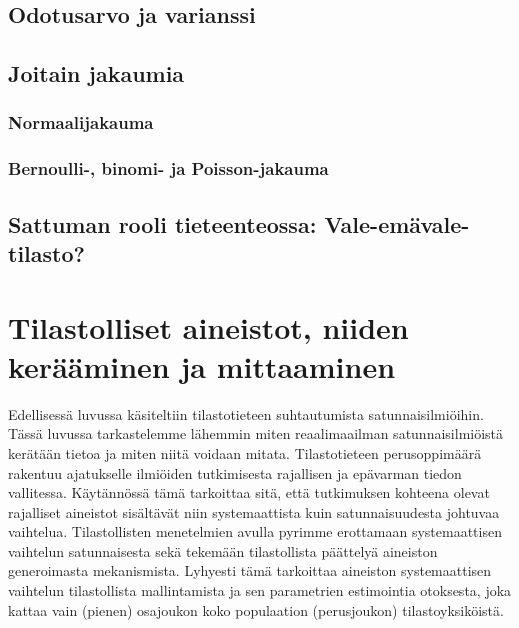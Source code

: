 \documentclass[
]{book}
\begin{document}
\hypertarget{alaluku44}{%
\section{Odotusarvo ja varianssi}\label{alaluku44}}

\hypertarget{alaluku45}{%
\section{Joitain jakaumia}\label{alaluku45}}

\hypertarget{normaalijakauma}{%
\subsection{Normaalijakauma}\label{normaalijakauma}}

\hypertarget{bernoulli--binomi--ja-poisson-jakauma}{%
\subsection{Bernoulli-, binomi- ja Poisson-jakauma}\label{bernoulli--binomi--ja-poisson-jakauma}}

\hypertarget{alaluku46}{%
\section{Sattuman rooli tieteenteossa: Vale-emävale-tilasto?}\label{alaluku46}}

\hypertarget{luku5}{%
\chapter{Tilastolliset aineistot, niiden kerääminen ja mittaaminen}\label{luku5}}

Edellisessä luvussa käsiteltiin tilastotieteen suhtautumista satunnaisilmiöihin. Tässä luvussa tarkastelemme lähemmin miten reaalimaailman satunnaisilmiöistä kerätään tietoa ja miten niitä voidaan mitata. Tilastotieteen perusoppimäärä rakentuu ajatukselle ilmiöiden tutkimisesta rajallisen ja epävarman tiedon vallitessa. Käytännössä tämä tarkoittaa sitä, että tutkimuksen kohteena olevat rajalliset aineistot sisältävät niin systemaattista kuin satunnaisuudesta johtuvaa vaihtelua. Tilastollisten menetelmien avulla pyrimme erottamaan systemaattisen vaihtelun satunnaisesta sekä tekemään tilastollista päättelyä aineiston generoimasta mekanismista. Lyhyesti tämä tarkoittaa aineiston systemaattisen vaihtelun tilastollista mallintamista ja sen parametrien estimointia otoksesta, joka kattaa vain (pienen) osajoukon koko populaation (perusjoukon) tilastoyksiköistä.
\end{document}
